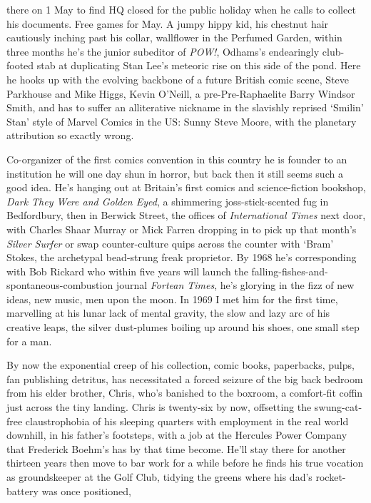 \documentclass[
]{article}
\begin{document}
there on 1 May to find HQ closed for the public holiday when he calls to
collect his documents. Free games for May. A jumpy hippy kid, his
chestnut hair cautiously inching past his collar, wallflower in the
Perfumed Garden, within three months he's the junior subeditor of
\emph{POW!}, Odhams's endearingly club-footed stab at duplicating Stan
Lee's meteoric rise on this side of the pond. Here he hooks up with the
evolving backbone of a future British comic scene, Steve Parkhouse and
Mike Higgs, Kevin O'Neill, a pre-Pre-Raphaelite Barry Windsor Smith, and
has to suffer an alliterative nickname in the slavishly reprised
`Smilin' Stan' style of Marvel Comics in the US: Sunny Steve Moore, with
the planetary attribution so exactly wrong. \par
Co-organizer of the first comics convention in this country he is
founder to an institution he will one day shun in horror, but back then
it still seems such a good idea. He's hanging out at Britain's first
comics and science-fiction bookshop, \emph{Dark They Were and Golden
Eyed}, a shimmering joss-stick-scented fug in Bedfordbury, then in
Berwick Street, the offices of \emph{International Times} next door,
with Charles Shaar Murray or Mick Farren dropping in to pick up that
month's \emph{Silver Surfer} or swap counter-culture quips across the
counter with `Bram' Stokes, the archetypal bead-strung freak proprietor.
By 1968 he's corresponding with Bob Rickard who within five years will
launch the falling-fishes-and-spontaneous-combustion journal
\emph{Fortean Times}, he's glorying in the fizz of new ideas, new music,
men upon the moon. In 1969 I met him for the first time, marvelling at
his lunar lack of mental gravity, the slow and lazy arc of his creative
leaps, the silver dust-plumes boiling up around his shoes, one small
step for a man. \par
By now the exponential creep of his collection, comic books,
paperbacks, pulps, fan publishing detritus, has necessitated a forced
seizure of the big back bedroom from his elder brother, Chris, who's
banished to the boxroom, a comfort-fit coffin just across the tiny
landing. Chris is twenty-six by now, offsetting the swung-cat-free
claustrophobia of his sleeping quarters with employment in the real
world downhill, in his father's footsteps, with a job at the Hercules
Power Company that Frederick Boehm's has by that time become. He'll stay
there for another thirteen years then move to bar work for a while
before he finds his true vocation as groundskeeper at the Golf Club,
tidying the greens where his dad's rocket-battery was once positioned,
\end{document}
